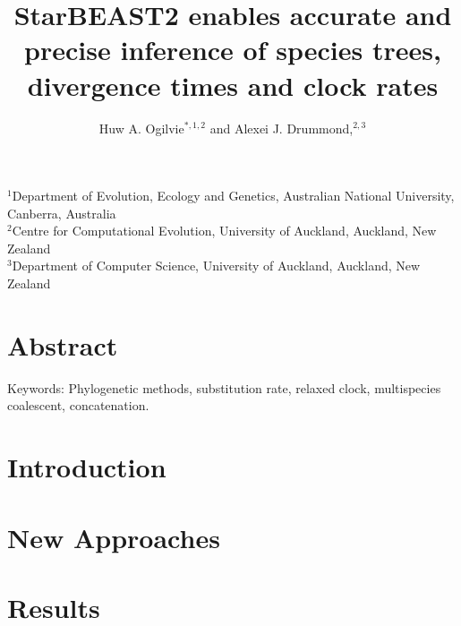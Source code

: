 \documentclass[12pt]{article}
\begin{document}
\begin{minipage}[h]{\textwidth}
	\title{StarBEAST2 enables accurate and precise inference of species trees, divergence times and clock rates}
	\author{Huw A. Ogilvie$^{\ast,1,2}$ and Alexei J. Drummond,$^{2,3}$}
    \maketitle
\end{minipage}

\raggedright
$^{1}$Department of Evolution, Ecology and Genetics, Australian National University, Canberra, Australia\\
$^{2}$Centre for Computational Evolution, University of Auckland, Auckland, New Zealand\\
$^{3}$Department of Computer Science, University of Auckland, Auckland, New Zealand

\clearpage

\section{Abstract}

Keywords: Phylogenetic methods, substitution rate, relaxed clock, multispecies coalescent, concatenation.

\section{Introduction}


\section{New Approaches}


\section{Results}

\clearpage
\end{document}
